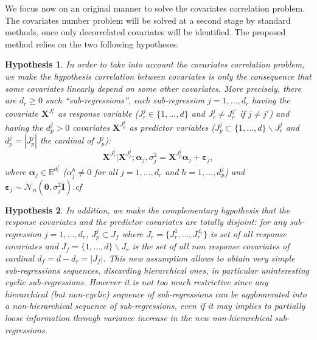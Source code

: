 \documentclass[11pt,a4paper]{article}
\newtheorem{hyp}{Hypothesis}
\begin{document}
We focus now on an original manner to solve the covariates correlation problem. The covariates number problem will be solved at a second stage by standard methods, once only decorrelated covariates will be identified. The proposed method relies on the two following hypotheses.

\begin{hyp}\label{H1}
In order to take into account the covariates correlation problem, we make the hypothesis correlation between covariates is {\it only} the consequence that some covariates {\it linearly} depend on some other covariates. More precisely, there are $d_{r}\geq 0$ such ``sub-regressions'', each sub-regression $j=1,\ldots,d_{r}$ having the covariate $\boldsymbol{X}^{J_{r}^j}$ as {\it response} variable ($J_{r}^j\in\{1,\ldots,d\}$ and $J_{r}^j\neq J_{r}^{j'}$ if $j\neq j'$) and having the $d_p^j>0$ covariates $\boldsymbol{X}^{J_{p}^j}$  as {\it predictor} variables ($J_{p}^j\subset\{1,\ldots,d\} \backslash J_{r}^j$ and $d_p^j=|J_{p}^j|$ the cardinal of $J_{p}^j$):
\begin{equation}
\boldsymbol{X}^{J_{r}^j}|\boldsymbol{X}^{J_{p}^j};\boldsymbol{\alpha}_j,\sigma^2_j=\boldsymbol{X}^{J_{p}^j}\boldsymbol{\alpha}_j+\boldsymbol{\varepsilon}_j, \label{eq:SR}
\end{equation}
where $\boldsymbol{\alpha}_j\in{\mathbb{R}^{d_r^j}}$ (${\alpha}_j^h\neq 0$ for all $j=1,\ldots,d_r$ and $h=1,\ldots,d_p^j$) and $\boldsymbol{\varepsilon}_j \sim\mathcal{N}_n(\boldsymbol{0},\sigma^2_j\boldsymbol{I})$.cf
\end{hyp}

\begin{hyp}\label{H2}
In addition, we make the complementary hypothesis that the response covariates and the predictor covariates are totally disjoint: for any sub-regression $j=1,\ldots,d_{r}$, $J_{p}^j\subset J_f$ where $J_{r}=\{J_{r}^1,\ldots,J_{r}^{d_r}\}$ is set of all response covariates and $J_f=\{1,\ldots,d\} \backslash J_{r}$ is the set of all {\it non} response covariates of cardinal $d_f=d-d_r=|J_f|$. This new assumption allows to obtain very simple sub-regressions sequences, discarding hierarchical ones, in particular uninteresting cyclic sub-regressions. However it is not too much restrictive since any hierarchical (but non-cyclic) sequence of sub-regressions can be agglomerated into a non-hierarchical sequence of sub-regressions, even if it may implies to partially loose information through variance increase in the new non-hierarchical sub-regressions.
\end{hyp}
\end{document}
